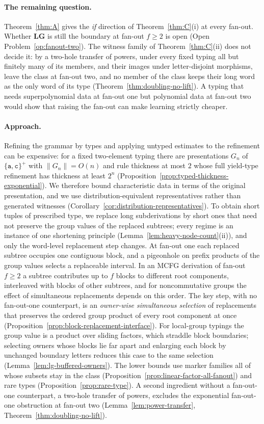 \paragraph{The remaining question.}
Theorem~\ref{thm:A} gives the \emph{if} direction of Theorem~\ref{thm:C}(i) at
every fan-out.  Whether $\mathbf{LG}$ is still the boundary at fan-out $f\ge2$
is open (Open Problem~\ref{op:fanout-two}).  The witness family of
Theorem~\ref{thm:C}(ii) does not decide it: by a two-hole transfer of powers,
under every fixed typing all but finitely many of its members, and their images
under letter-disjoint morphisms, leave the class at fan-out two, and no member
of the class keeps their long word as the only word of its type
(Theorem~\ref{thm:doubling-no-lift}).  A typing that needs superpolynomial data
at fan-out one but polynomial data at fan-out two would show that raising the
fan-out can make learning strictly cheaper.

\paragraph{Approach.}
Refining the grammar by types and applying untyped estimates to the
refinement can be expensive: for a fixed two-element typing there are
presentations $G_n$ of $\{\mathtt a,\mathtt c\}^+$ with $\|G_n\|=O(n)$ and
rule thickness at most $2$ whose full yield-type refinement has thickness at
least $2^n$ (Proposition~\ref{prop:typed-thickness-exponential}).  We
therefore bound characteristic data in terms of the original presentation,
and we use distribution-equivalent representatives rather than generated
witnesses (Corollary~\ref{cor:distribution-representatives}).
To obtain short tuples of prescribed type, we replace long subderivations
by short ones that need not preserve the group values of the replaced
subtrees; every regime is an instance of one shortening principle
(Lemma~\ref{lem:heavy-node-count}(ii)), and only the word-level replacement step
changes.  At fan-out one each replaced subtree occupies one contiguous block,
and a pigeonhole on prefix products of the group values selects a replaceable
interval.  In an MCFG derivation of fan-out $f\ge2$ a subtree contributes up to $f$
blocks to different root components, interleaved with blocks of other subtrees,
and for noncommutative groups the effect of simultaneous replacements depends on
this order.  The key step, with no fan-out-one counterpart, is an
\emph{owner-wise simultaneous selection} of replacements that preserves the
ordered group product of every root component at once
(Proposition~\ref{prop:block-replacement-interface}).  For
local-group typings the group value is a product over sliding factors, which
straddle block boundaries; selecting owners whose blocks lie far apart and
enlarging each block by unchanged boundary letters reduces this case to the
same selection (Lemma~\ref{lem:lg-buffered-owners}).  The lower bounds use
marker families all of whose subsets stay in the class
(Proposition~\ref{prop:linear-factor-all-fanout}) and rare types
(Proposition~\ref{prop:rare-type}).  A second ingredient without a fan-out-one
counterpart, a two-hole transfer of powers, excludes the exponential fan-out-one
obstruction at fan-out two (Lemma~\ref{lem:power-transfer},
Theorem~\ref{thm:doubling-no-lift}).

